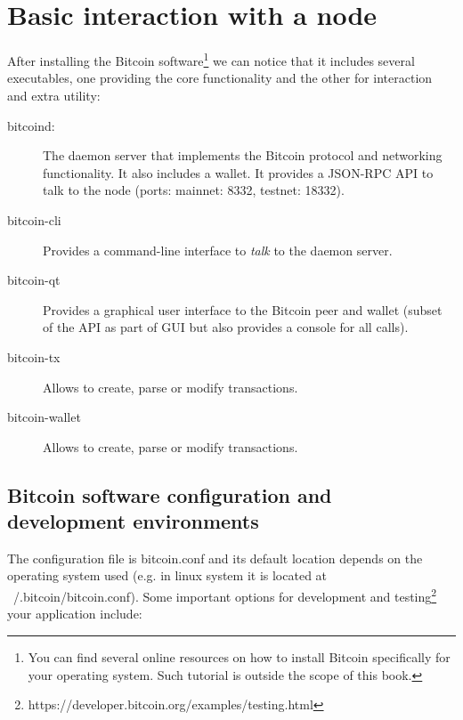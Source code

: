 \section{Basic interaction with a node}
After installing the Bitcoin software\footnote{You can find several online resources on how to install Bitcoin specifically for your operating system. Such tutorial is outside the scope of this book.} we can notice that it includes several executables, one providing the core functionality and the other for interaction and extra utility:
\begin{description}
	\item[bitcoind:] The daemon server that implements the Bitcoin protocol and networking functionality. It also includes a wallet. It provides a JSON-RPC API to talk to the node (ports: mainnet: 8332, testnet: 18332).
	\item[bitcoin-cli] Provides a command-line interface to \emph{talk} to the daemon server.
	\item[bitcoin-qt] Provides a graphical user interface to the Bitcoin peer and wallet (subset of the API as part of GUI but also provides a console for all calls).
	\item[bitcoin-tx] Allows to create, parse or modify transactions.
	\item[bitcoin-wallet] Allows to create, parse or modify transactions.
\end{description}

\subsection*{Bitcoin software configuration and development environments}
The configuration file is bitcoin.conf and its default location depends on the operating system used (e.g. in linux system it is located at ~/.bitcoin/bitcoin.conf). Some important options for development and testing\footnote{https://developer.bitcoin.org/examples/testing.html} your application include:

